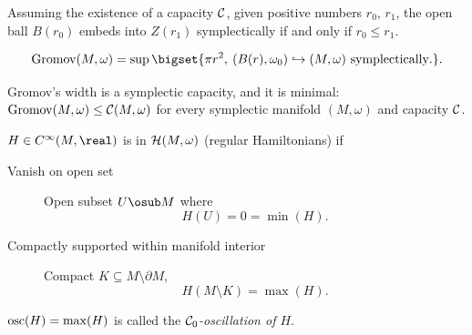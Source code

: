 \documentclass[../main-v2-manifolds.tex]{subfiles}
\begin{document}
\begin{wts}
     Assuming the existence of a capacity $\mathcal{C}$, given positive numbers $r_0$, $r_1$, the open ball $B(r_0)$ embeds into $Z(r_1)$ symplectically if and only if $r_0\leq r_1$.
\end{wts}
\begin{definition}
    \[
        \Grom(M,\omega) = \sup\bigset{\pi r^2,\:(B(r),\omega_0)\hookrightarrow (M,\omega) \text{ symplectically}.}.
    \]
\end{definition}
\begin{wts}
    Gromov's width is a symplectic capacity, and it is minimal: $\mathrm{Gromov}(M,\omega) \leq \mathcal{C}(M,\omega)$ for every symplectic manifold $(M,\omega)$ and capacity $\mathcal{C}$.
\end{wts}
\begin{definition}
    $H\in C^\infty(M,\real)$ is in $\mathcal{H}(M,\omega)$ (regular Hamiltonians) if
    \begin{description}
        \item[Vanish on open set] Open subset $U\osub M$ where
        \[H(U) = 0=\min(H).\]
        \item[Compactly supported within manifold interior] Compact $K\subseteq M\setminus \partial M$, 
        \[H(M\setminus K) = \max(H).\]
    \end{description}
\end{definition}
\begin{definition}
    $\mathrm{osc}(H) =\max(H)$ is called the \emph{$\mathcal{C}_0$-oscillation of $H$}.
\end{definition}
\end{document}
